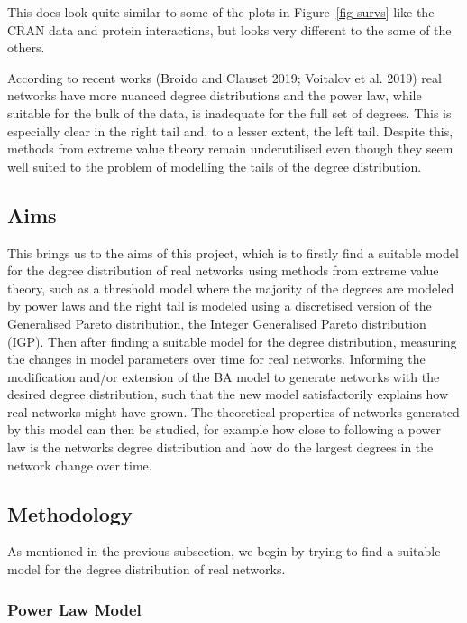 \documentclass[
]{article}
\begin{document}
This does look quite similar to some of the plots in
Figure~\ref{fig-survs} like the CRAN data and protein interactions, but
looks very different to the some of the others.

According to recent works (Broido and Clauset 2019; Voitalov et al.
2019) real networks have more nuanced degree distributions and the power
law, while suitable for the bulk of the data, is inadequate for the full
set of degrees. This is especially clear in the right tail and, to a
lesser extent, the left tail. Despite this, methods from extreme value
theory remain underutilised even though they seem well suited to the
problem of modelling the tails of the degree distribution.

\subsection{Aims}\label{aims}

This brings us to the aims of this project, which is to firstly find a
suitable model for the degree distribution of real networks using
methods from extreme value theory, such as a threshold model where the
majority of the degrees are modeled by power laws and the right tail is
modeled using a discretised version of the Generalised Pareto
distribution, the Integer Generalised Pareto distribution (IGP). Then
after finding a suitable model for the degree distribution, measuring
the changes in model parameters over time for real networks. Informing
the modification and/or extension of the BA model to generate networks
with the desired degree distribution, such that the new model
satisfactorily explains how real networks might have grown. The
theoretical properties of networks generated by this model can then be
studied, for example how close to following a power law is the networks
degree distribution and how do the largest degrees in the network change
over time.

\subsection{Methodology}\label{methodology}

As mentioned in the previous subsection, we begin by trying to find a
suitable model for the degree distribution of real networks.

\subsubsection{Power Law Model}\label{sec-pl}
\end{document}
